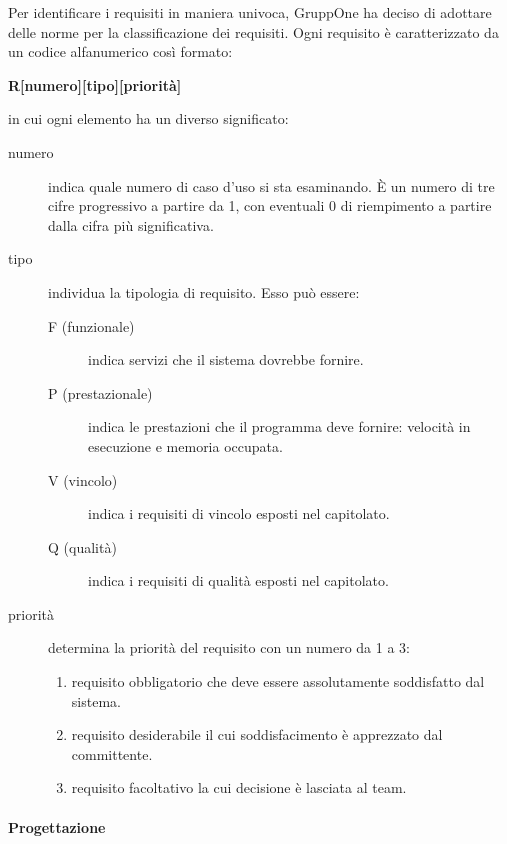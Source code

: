 \documentclass[../../norme-di-progetto.tex]{subfiles}
\begin{document}
Per identificare i requisiti in maniera univoca, GruppOne ha deciso di adottare delle norme per la classificazione dei requisiti.
Ogni requisito è caratterizzato da un codice alfanumerico così formato:
\begin{center}
  \textbf{R[numero][tipo][priorità]}
\end{center}
in cui ogni elemento ha un diverso significato:
\begin{description}
  \item [numero] indica quale numero di caso d'uso si sta esaminando. È un numero di tre cifre progressivo a partire da 1, con eventuali 0 di riempimento a partire dalla cifra più significativa.
  \item [tipo] individua la tipologia di requisito. Esso può essere:
        \begin{description}
          \item [F (funzionale)] indica servizi che il sistema dovrebbe fornire.
          \item [P (prestazionale)] indica le prestazioni che il programma deve fornire: velocità in esecuzione e memoria occupata.
          \item [V (vincolo)] indica i requisiti di vincolo esposti nel capitolato.
          \item [Q (qualità)] indica i requisiti di qualità esposti nel capitolato.
        \end{description}
  \item [priorità] determina la priorità del requisito con un numero da 1 a 3:
        \begin{enumerate}
          \item requisito obbligatorio che deve essere assolutamente soddisfatto dal sistema.
          \item requisito desiderabile il cui soddisfacimento è apprezzato dal committente.
          \item requisito facoltativo la cui decisione è lasciata al team.
        \end{enumerate}
\end{description}


\paragraph{Progettazione}%
\label{par:progettazione}
\end{document}
